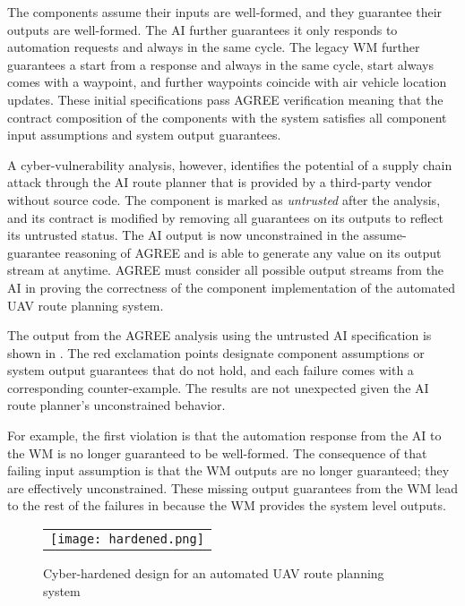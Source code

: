 The components assume their inputs are well-formed, and they guarantee their outputs are well-formed.
The AI further guarantees it only responds to automation requests and always in the same cycle.
The legacy WM further guarantees a start from a response and always in the same cycle, start always comes with a waypoint, and further waypoints coincide with air vehicle location updates.
These initial specifications pass AGREE verification meaning that the contract composition of the components with the system satisfies all component input assumptions and system output guarantees.

A cyber-vulnerability analysis, however, identifies the potential of a supply chain attack through the AI route planner that is provided by a third-party vendor without source code.
The component is marked as \emph{untrusted} after the analysis, and its contract is modified by removing all guarantees on its outputs to reflect its untrusted status.
The AI output is now unconstrained in the assume-guarantee reasoning of AGREE and is able to generate any value on its output stream at anytime.
AGREE must consider all possible output streams from the AI in proving the correctness of the component implementation of the automated UAV route planning system.

The output from the AGREE analysis using the untrusted AI specification is shown in .
The red exclamation points designate component assumptions or system output guarantees that do not hold, and each failure comes with a corresponding counter-example.
The results are not unexpected given the AI route planner's unconstrained behavior.

For example, the first violation is that the automation response from the AI to the WM is no longer guaranteed to be well-formed.
The consequence of that failing input assumption is that the WM outputs are no longer guaranteed; they are effectively unconstrained.
These missing output guarantees from the WM lead to the rest of the failures in  because the WM provides the system level outputs.

\begin{figure*}
  \begin{center}
    \begin{tabular}{c}
      \texttt{[image: hardened.png]}
    \end{tabular}
  \end{center}
  \caption{Cyber-hardened design for an automated UAV route planning system}
  \label{fig:hardened}
\end{figure*}

